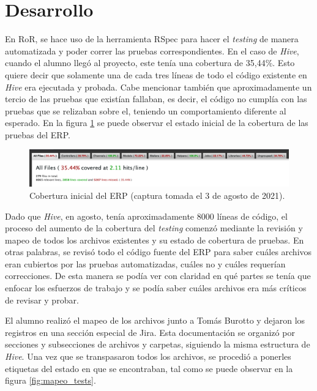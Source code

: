 \section{Desarrollo}

  En RoR, se hace uso de la herramienta RSpec para hacer el \textit{testing} de manera automatizada y poder correr las pruebas correspondientes. En el caso de \textit{Hive}, cuando el alumno llegó al proyecto, este tenía una cobertura de 35,44\%. Esto quiere decir que solamente una de cada tres líneas de todo el código existente en \textit{Hive} era ejecutada y probada. Cabe mencionar también que aproximadamente un tercio de las pruebas que existían fallaban, es decir, el código no cumplía con las pruebas que se relizaban sobre el, teniendo un comportamiento diferente al esperado.
   En la figura \ref{fig:testing_original} se puede observar el estado inicial de la cobertura de las pruebas del ERP.

  \begin{figure}[H]
    \centering
    \includegraphics[width=\linewidth]{figures/testing/testing_original.png}
    \caption{Cobertura inicial del ERP (captura tomada el 3 de agosto de 2021).}
    \label{fig:testing_original}
  \end{figure}

  Dado que \textit{Hive}, en agosto, tenía aproximadamente 8000 líneas de código, el proceso del aumento de la cobertura del \textit{testing} comenzó mediante la revisión y mapeo de todos los archivos existentes y su estado de cobertura de pruebas. En otras palabras, se revisó todo el código fuente del ERP para saber cuáles archivos eran cubiertos por las pruebas automatizadas, cuáles no y cuáles requerían correcciones. De esta manera se podía ver con claridad en qué partes se tenía que enfocar los esfuerzos de trabajo y se podía saber cuáles archivos era más críticos de revisar y probar.

  El alumno realizó el mapeo de los archivos junto a Tomás Burotto y dejaron los registros en una sección especial de Jira. Esta documentación se organizó por secciones y subsecciones de archivos y carpetas, siguiendo la misma estructura de \textit{Hive}. Una vez que se transpasaron todos los archivos, se procedió a ponerles etiquetas del estado en que se encontraban, tal como se puede observar en la figura \ref{fig:mapeo_tests}.
  
